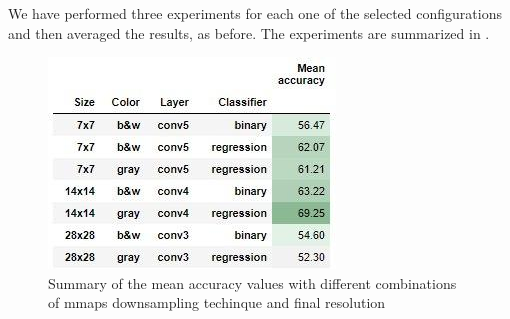 \documentclass[10pt,twocolumn,hidelinks,letterpaper]{article}
\begin{document}
\begin{center}
\end{center}

We have performed three experiments for each one of the selected configurations and then averaged the results, as before. The experiments are summarized in .

\begin{figure}[t]
  \centering
  \includegraphics[width=.7\linewidth]{images/step3.1_table.jpg}
  \caption{Summary of the mean accuracy values with different combinations of mmaps downsampling techinque and final resolution}
  \label{mmaps_table}
\end{figure}
\end{document}
